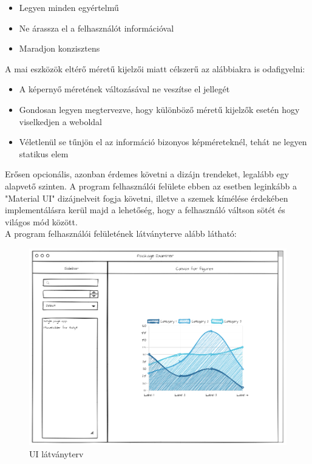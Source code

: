 \begin{itemize}
	\item Legyen minden egyértelmű
	\item Ne árassza el a felhasználót információval
	\item Maradjon konzisztens
\end{itemize}

\noindent A mai eszközök eltérő méretű kijelzői miatt célszerű az alábbiakra is odafigyelni:

\begin{itemize}
	\item A képernyő méretének változásával ne veszítse el jellegét
	\item Gondosan legyen megtervezve, hogy különböző méretű kijelzők esetén hogy viselkedjen a weboldal
	\item Véletlenül se tűnjön el az információ bizonyos képméreteknél, tehát ne legyen statikus elem
\end{itemize}

Erősen opcionális, azonban érdemes követni a dizájn trendeket, legalább egy alapvető szinten. A program felhasználói felülete ebben az esetben leginkább a "Material UI" dizájnelveit fogja követni, illetve a szemek kímélése érdekében implementálásra kerül majd a lehetőség, hogy a felhasználó váltson sötét és világos mód között.\\

A program felhasználói felületének látványterve alább látható:

\begin{figure}[!h]
	\centering
	\includegraphics[scale=0.5]{images/ui_plan.png}
	\caption{UI látványterv}
	\label{fig:ui_plan}
\end{figure}

